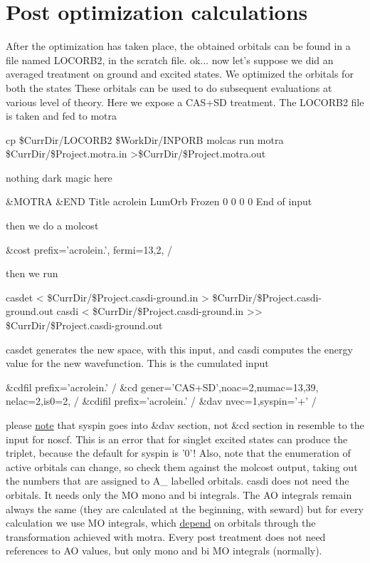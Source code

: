 \documentclass[11pt,a4paper]{article}
\begin{document}
\section{Post optimization calculations}

After the optimization has taken place, the obtained orbitals can be found
in a file named LOCORB2, in the scratch file.
ok... now let's suppose we did an averaged treatment on ground and excited
states. We optimized the orbitals for both the states
These orbitals can be used to do subsequent evaluations at various level of
theory. Here we expose a CAS+SD treatment. The LOCORB2 file is taken and fed
to motra

cp \$CurrDir/LOCORB2 \$WorkDir/INPORB
molcas run motra   \$CurrDir/\$Project.motra.in >\$CurrDir/\$Project.motra.out

nothing dark magic here

 \&MOTRA \&END
Title
 acrolein
LumOrb
Frozen
 0 0 0 0
End of input

then we do a molcost

\&cost prefix='acrolein.',
 fermi=13,2,
/

then we run

casdet <  \$CurrDir/\$Project.casdi-ground.in > \$CurrDir/\$Project.casdi-ground.out
casdi <   \$CurrDir/\$Project.casdi-ground.in >> \$CurrDir/\$Project.casdi-ground.out

casdet generates the new space, with this input, and casdi computes the
energy value for the new wavefunction. This is the cumulated input

 \&cdfil prefix='acrolein.'  /
 \&cd gener='CAS+SD',noac=2,numac=13,39,
 nelac=2,is0=2,  /
 \&cdifil prefix='acrolein.'  /
 \&dav nvec=1,syspin='+' /

please \underline{note} that syspin goes into \&dav section, not \&cd section
in resemble to the input for noscf. This is an error that for singlet excited states
can produce the triplet, because the default for syspin is '0'!
Also, note that the enumeration of active orbitals can change, so check them
against the molcost output, taking out the numbers that are assigned to A\_
labelled orbitals.
casdi does not need the orbitals. It needs only the MO mono and bi
integrals. The AO integrals remain always the same (they are calculated at
the beginning, with seward) but for every calculation we use MO integrals,
which \underline{depend} on orbitals through the transformation achieved
with motra. Every post treatment does not need references to AO values, but
only mono and bi MO integrals (normally).
\end{document}
